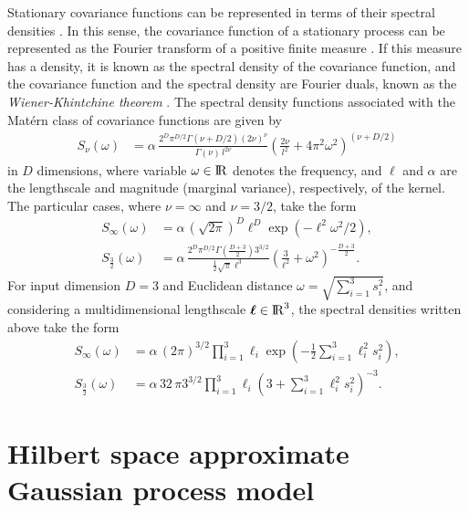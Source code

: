 \documentclass[onecolumn,a4paper,11pt]{article}
\begin{document}
Stationary covariance functions can be represented in terms of their spectral densities \citep[see, e.g.,][]{rasmussen2006gaussian}. In this sense, the covariance function of a stationary process can be represented as the Fourier transform of a positive finite measure \citep[\textit{Bochner's theorem}; see, e.g., ][]{akhiezer1993theory}. If this measure has a density, it is known as the spectral density of the covariance function, and the covariance function and the spectral density are Fourier duals, known as the \textit{Wiener-Khintchine theorem} \citep{rasmussen2006gaussian}. The spectral density functions associated with the Mat\'ern class of covariance functions are given by
%
\begin{align*}
S_{\nu}(\omega)&= \alpha \, \frac{2^D\pi^{D/2}\Gamma(\nu+D/2)(2\nu)^{\nu}}{\Gamma(\nu)\, l^{2\nu}}\left(\frac{2\nu}{l^2}+4\pi^2\omega^2 \right)^{(\nu+D/2)}
\end{align*}
%
in $D$ dimensions, where variable $\omega\in {\rm I\!R}$ denotes the frequency, and $\ell$ and $\alpha$ are the lengthscale and magnitude (marginal variance), respectively, of the kernel. The particular cases, where $\nu=\infty$ and $\nu=3/2$, take the form
%
\begin{align}
S_{\infty}(\omega)&= \alpha\,(\sqrt{2\pi})^D  \ell^D \exp(-\ell^2 \omega^2 / 2), \label{eq_specdens_inf}  \\
S_{\frac{3}{2}}(\omega)&= \alpha\,\frac{2^D\pi^{D/2}\Gamma(\frac{D+3}{2}){3}^{3/2}}{\frac{1}{2}\sqrt{\pi}\ell^3}\left(\frac{3}{\ell^2}+\omega^2 \right)^{-\frac{D+3}{2}}. \label{eq_specdens_32} 
\end{align}
%
For input dimension $D=3$ and Euclidean distance $\omega=\sqrt{\sum_{i=1}^{3}s_i^2}$, and considering a multidimensional lengthscale $\bm{\ell} \in {\rm I\!R}^{3}$, the spectral densities written above take the form
%
\begin{align*}
S_{\infty}(\omega)&= \alpha \, (2\pi)^{3/2}  \prod_{i=1}^{3} \ell_i  \exp\!\left(-\frac{1}{2} \sum_{i=1}^{3} \ell_i^2 s_i^2 \right),   \\
S_{\frac{3}{2}}(\omega)&= \alpha \, 32\,\pi {3}^{3/2}\prod_{i=1}^{3}\ell_i\left(3+\sum_{i=1}^{3}\ell_i^2 s_i^2 \right)^{-3}.
\end{align*}


\section{Hilbert space approximate Gaussian process model}\label{ch5_sec_method}
\end{document}
